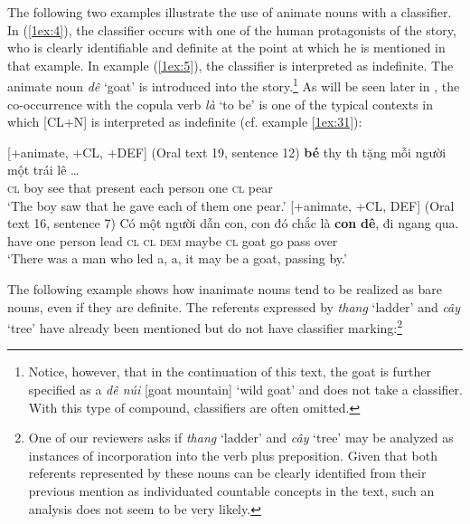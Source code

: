 \documentclass[output=paper]{langsci/langscibook}
\begin{document}
The following two examples illustrate the use of animate nouns with a classifier. In (\ref{1ex:4}), the classifier occurs with one of the human protagonists of the story, who is clearly identifiable and definite at the point at which he is mentioned in that example. In example (\ref{1ex:5}), the classifier is interpreted as indefinite. The animate noun {\emph{d\^e}} `goat' is introduced into the story.\footnote{Notice, however, that in the continuation of this text, the goat is further specified as a {\emph{d\^e n\'ui}} [goat mountain] `wild goat' and does not take a classifier. With this type of compound, classifiers are often omitted.} As will be seen later in , the co-occurrence with the copula verb {\emph{l\`a}} `to be' is one of the typical contexts in which [CL+N] is interpreted as indefinite (cf. example \ref{1ex:31}):

\begin{exe}
\ex\label{1ex:4}
[+animate, +CL, +DEF] (Oral text 19, sentence 12)
\exi{}
 {\textbf{bé}}   th{\daa}y  th{\dae}  tặng        mỗi   người    một  trái  lê … \\
{\textsc{cl}}  boy  see   that  present  each  person   one  {\textsc{cl}}   pear \\
\glt `The boy saw that he gave each of them one pear.'
\ex\label{1ex:5}
[+animate, +CL, \minus DEF] (Oral text 16, sentence 7) 
\exi{}
\gll Có 	một 	người   dẫn  con,  con  đó      {chắc là}   {\textbf{con}}  {\textbf{dê}},    đi    ngang   qua. \\
have  one   person  lead  {\textsc{cl}}   {\textsc{cl}}  {\textsc{dem}}  maybe    {\textsc{cl}}  goat   go   pass      over \\
\glt `There was a man who led a, a, it may be a goat, passing by.' \\
\end{exe}

\newpage
The following example shows how inanimate nouns tend to be realized as bare nouns, even if they are definite. The referents expressed by {\emph{thang}} `ladder' and {\emph{cây}} `tree' have already been mentioned but do not have classifier marking:\footnote{One of our reviewers asks if {\emph{thang}} `ladder' and {\emph{cây}} `tree' may be analyzed as instances of incorporation into the verb plus preposition. Given that both referents represented by these nouns can be clearly identified from their previous mention as individuated countable concepts in the text, such an analysis does not seem to be very likely.}
\end{document}
